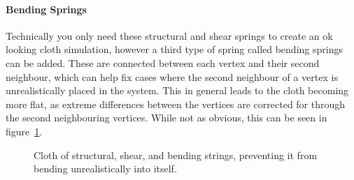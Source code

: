 \paragraph{Bending Springs}
Technically you only need these structural and shear springs to create an ok looking cloth simulation,
however a third type of spring called bending springs can be added.
These are connected between each vertex and their second neighbour,
which can help fix cases where the second neighbour of a vertex is unrealistically placed in the system.
This in general leads to the cloth becoming more flat, as extreme differences between the vertices are corrected for
through the second neighbouring vertices\cite{jeff_lander_real_time_cloth}.
While not as obvious, this can be seen in figure~\ref{fig:bending_springs_collapsing}.
\begin{figure}[H]
    \centering
    \caption{Cloth of structural, shear, and bending strings, preventing it from bending unrealistically into itself.}
    \label{fig:bending_springs_collapsing}
\end{figure}


